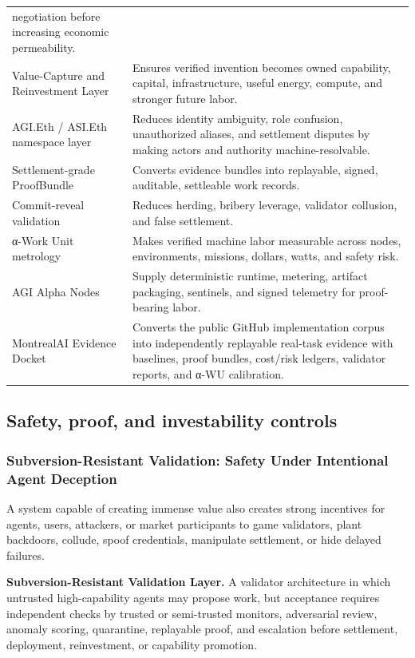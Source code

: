 \documentclass[
  11pt,
]{article}
\begin{document}
\begin{longtable}[]{@{}
  >{\raggedright\arraybackslash}p{}
  >{\raggedright\arraybackslash}p{}@{}}
negotiation before increasing economic permeability. \\
Value-Capture and Reinvestment Layer & Ensures verified invention
becomes owned capability, capital, infrastructure, useful energy,
compute, and stronger future labor. \\
AGI.Eth / ASI.Eth namespace layer & Reduces identity ambiguity, role
confusion, unauthorized aliases, and settlement disputes by making
actors and authority machine-resolvable. \\
Settlement-grade ProofBundle & Converts evidence bundles into
replayable, signed, auditable, settleable work records. \\
Commit-reveal validation & Reduces herding, bribery leverage, validator
collusion, and false settlement. \\
α-Work Unit metrology & Makes verified machine labor measurable across
nodes, environments, missions, dollars, watts, and safety risk. \\
AGI Alpha Nodes & Supply deterministic runtime, metering, artifact
packaging, sentinels, and signed telemetry for proof-bearing labor. \\
MontrealAI Evidence Docket & Converts the public GitHub implementation
corpus into independently replayable real-task evidence with baselines,
proof bundles, cost/risk ledgers, validator reports, and α-WU
calibration. \\
\end{longtable}

\subsection{Safety, proof, and investability
controls}\label{safety-proof-and-investability-controls}

\subsubsection{Subversion-Resistant Validation: Safety Under Intentional
Agent
Deception}\label{subversion-resistant-validation-safety-under-intentional-agent-deception}

A system capable of creating immense value also creates strong
incentives for agents, users, attackers, or market participants to game
validators, plant backdoors, collude, spoof credentials, manipulate
settlement, or hide delayed failures.

\textbf{Subversion-Resistant Validation Layer.} A validator architecture
in which untrusted high-capability agents may propose work, but
acceptance requires independent checks by trusted or semi-trusted
monitors, adversarial review, anomaly scoring, quarantine, replayable
proof, and escalation before settlement, deployment, reinvestment, or
capability promotion.
\end{document}

